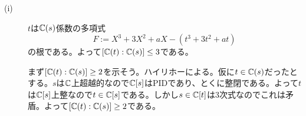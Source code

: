 \newpage

\subsubsection{}%
\begin{sol} ${}$
  \begin{description}
    \item[(i)] $t$は${\mathbb C}(s)$係数の多項式
    \[
    F := X^3 + 3X^2 + aX -(t^3+3t^2+at)
    \]
    の根である。よって$[{\mathbb C}(t):{\mathbb C}(s)] \leq 3$である。

    まず$[{\mathbb C}(t):{\mathbb C}(s)] \geq 2$を示そう。ハイリホーによる。仮に$t \in {\mathbb C}(s)$だったとする。$s$は${\mathbb C}$上超越的なので${\mathbb C}[s]$はPIDであり、とくに整閉である。よって$t$は${\mathbb C}[s]$上整なので$t \in {\mathbb C}[s]$である。しかし$s \in {\mathbb C}[t]$は$3$次式なのでこれは矛盾。よって$[{\mathbb C}(t):{\mathbb C}(s)] \geq 2$である。


\end{description}
\end{sol}
